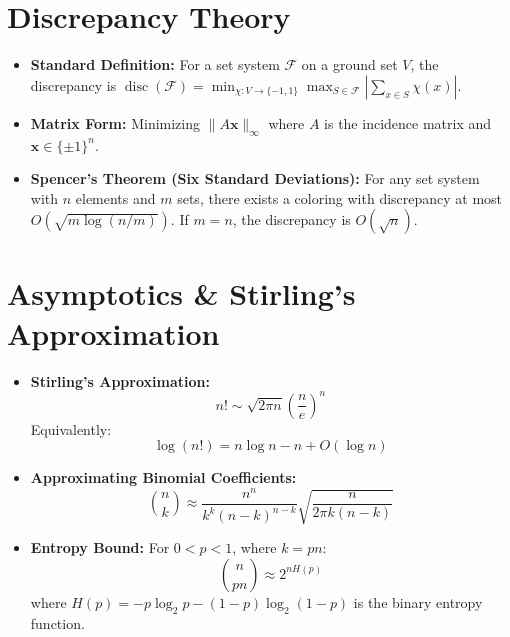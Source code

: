 \documentclass[11pt]{article}
\DeclareMathOperator{\disc}{disc}
\begin{document}
\part{Discrepancy Theory}

\begin{itemize}
    \item \textbf{Standard Definition:} For a set system \(\mathcal{F}\) on a ground set \(V\), the discrepancy is \(\disc(\mathcal{F}) = \min_{\chi: V \to \{-1,1\}} \max_{S \in \mathcal{F}} |\sum_{x \in S} \chi(x)|\).
    \item \textbf{Matrix Form:} Minimizing \(\|A\mathbf{x}\|_\infty\) where \(A\) is the incidence matrix and \(\mathbf{x} \in \{\pm 1\}^n\).
    \item \textbf{Spencer's Theorem (Six Standard Deviations):} For any set system with \(n\) elements and \(m\) sets, there exists a coloring with discrepancy at most \(O(\sqrt{m \log(n/m)})\). If \(m=n\), the discrepancy is \(O(\sqrt{n})\).
\end{itemize}

\hrulefill

\part{Asymptotics \& Stirling's Approximation}

\begin{itemize}
    \item \textbf{Stirling's Approximation:}
    \[
 n! \sim \sqrt{2\pi n} \left(\frac{n}{e}\right)^n 
\]
    Equivalently:
    \[
 \log(n!) = n \log n - n + O(\log n) 
\]
    \item \textbf{Approximating Binomial Coefficients:}
    \[
 \binom{n}{k} \approx \frac{n^n}{k^k (n-k)^{n-k}} \sqrt{\frac{n}{2\pi k(n-k)}} 
\]
    \item \textbf{Entropy Bound:} For \(0 < p < 1\), where \(k = pn\):
    \[
 \binom{n}{pn} \approx 2^{n H(p)} 
\]
    where \(H(p) = -p \log_2 p - (1-p) \log_2 (1-p)\) is the binary entropy function.
\end{itemize}
\end{document}
